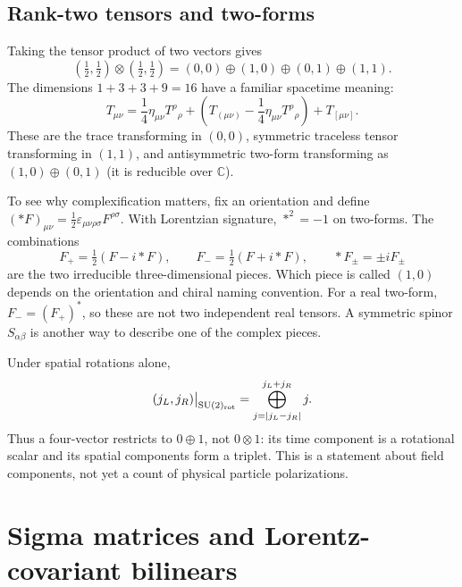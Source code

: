 \documentclass[11pt]{article}
\newcommand{\C}{\mathbb C}
\newcommand{\SU}{\mathrm{SU}}
\newcommand{\eps}{\varepsilon}
\begin{document}
\subsection{Rank-two tensors and two-forms}
Taking the tensor product of two vectors gives
\begin{equation}
 (\tfrac12,\tfrac12)\otimes(\tfrac12,\tfrac12)
  =(0,0)\oplus(1,0)\oplus(0,1)\oplus(1,1).
 \label{eq:ranktwo}
\end{equation}
The dimensions \(1+3+3+9=16\) have a familiar spacetime meaning:
\begin{equation}
 T_{\mu\nu}=\frac14\eta_{\mu\nu}T^\rho{}_{\rho}
  +\left(T_{(\mu\nu)}-\frac14\eta_{\mu\nu}T^\rho{}_{\rho}\right)
  +T_{[\mu\nu]}.
 \label{eq:tensordecomp}
\end{equation}
These are the trace transforming in $(0,0)$, symmetric traceless tensor transforming in $(1,1)$, and antisymmetric
two-form transforming as  \((1,0)\oplus(0,1)\) (it is reducible over \(\C\)).

To see why complexification matters, fix an orientation and define
\((*F)_{\mu\nu}=\tfrac12\eps_{\mu\nu\rho\sigma}F^{\rho\sigma}\).
With Lorentzian signature, \(*^2=-1\) on two-forms. The combinations
\begin{equation}
 F_+=\tfrac12(F-i*F),\qquad F_-=\tfrac12(F+i*F),
 \qquad *F_\pm=\pm iF_\pm
 \label{eq:selfdual}
\end{equation}
are the two irreducible three-dimensional pieces. Which piece is called
\((1,0)\) depends on the orientation and chiral naming convention.
For a real two-form, \(F_-=(F_+)^*\), so these are not two independent
real tensors. A symmetric spinor \(S_{\alpha\beta}\) is another way
to describe one of the complex pieces.

Under spatial rotations alone,
\begin{equation}
 (j_L,j_R)\big|_{\SU(2)_{\rm rot}}
     =\bigoplus_{j=|j_L-j_R|}^{j_L+j_R}j.
 \label{eq:rotationcontent}
\end{equation}
Thus a four-vector restricts to \(0\oplus1\), not \(0\otimes1\):
its time component is a rotational scalar and its spatial components
form a triplet. This is a statement about field components, not yet a
count of physical particle polarizations.

\section{Sigma matrices and Lorentz-covariant bilinears}
\end{document}
